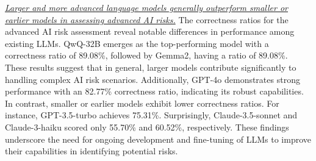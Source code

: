 \textit{\ul{Larger and more advanced language models generally outperform smaller or earlier models in assessing advanced AI risks.}} The correctness ratios for the advanced AI risk assessment reveal notable differences in performance among existing LLMs. QwQ-32B emerges as the top-performing model with a correctness ratio of 89.08\%, followed by Gemma2, having a ratio of 89.08\%. These results suggest that in general, larger models contribute significantly to handling complex AI risk scenarios. Additionally, GPT-4o demonstrates strong performance with an 82.77\% correctness ratio, indicating its robust capabilities. In contrast, smaller or earlier models exhibit lower correctness ratios. For instance, GPT-3.5-turbo achieves 75.31\%. Surprisingly, Claude-3.5-sonnet and Claude-3-haiku scored only 55.70\% and 60.52\%, respectively. These findings underscore the need for ongoing development and fine-tuning of LLMs to improve their capabilities in identifying potential risks.


